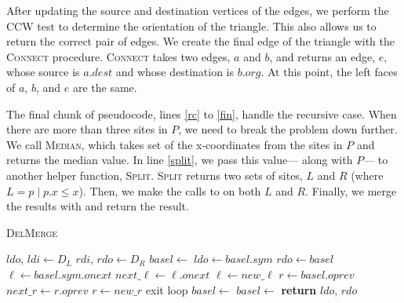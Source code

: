 \documentclass[12pt,twoside]{reedthesis}
\begin{document}
    After updating the source and destination vertices of the edges, we perform the \textsc{CCW} test to determine the orientation of the triangle. This also allows us to return the correct pair of edges. We create the final edge of the triangle with the \textsc{Connect} procedure. \textsc{Connect} takes two edges, $a$ and $b$, and returns an edge, $e$, whose source is $a.dest$ and whose destination is $b.org$. At this point, the left faces of $a$, $b$, and $e$ are the same. \par

    The final chunk of pseudocode, lines \ref{rc} to \ref{fin}, handle the recursive case. When there are more than three sites in $P$, we need to break the problem down further. We call \textsc{Median}, which takes set of the x-coordinates from the sites in $P$ and returns the median value. In line \ref{split}, we pass this value--- along with $P$--- to another helper function, \textsc{Split}. \textsc{Split} returns two sets of sites, $L$ and $R$ (where $L = {p \mid p.x \leq x}$). Then, we make the calls to  on both $L$ and $R$. Finally, we merge the results with  and return the result.\par

    \begin{algorithm}[H]
    \caption{\textsc{DelMerge}}\label{del_merge}
     \begin{algorithmic}[1]
    \State $ldo$, $ldi\gets D_{L}$
    \State $rdi$, $rdo\gets D_{R}$
    \State $basel\gets$ \label{lct}
      \State $ldo\gets basel.sym$
    \EndIf
      \State $rdo\gets basel$
    \EndIf
    \Loop \label{rb}
      \State $\ell\gets basel.sym.onext$
       \label{valid_l}
        \label{rm_l}
          \State $next\_\ell \gets \ell.onext$
          \State {}
          \State $\ell \gets new\_\ell$
        \EndWhile
      \EndIf
      \State $r \gets basel.oprev$
        \label{rm_r}
          \State $next\_r \gets r.oprev$
          \State {}
          \State $r \gets new\_r$
        \EndWhile
      \EndIf
       \label{ce}
        \State exit loop
      \EndIf
      \label{ce_1}
        \State $basel\gets$  \label{ce_add1}
      \Else
        \State $basel\gets$  \label{ce_add2}
      \EndIf
    \EndLoop \label{rb_end}
    \State \textbf{return} $ldo$, $rdo$
    \EndProcedure
    \end{algorithmic} 
    \end{algorithm}
\end{document}

